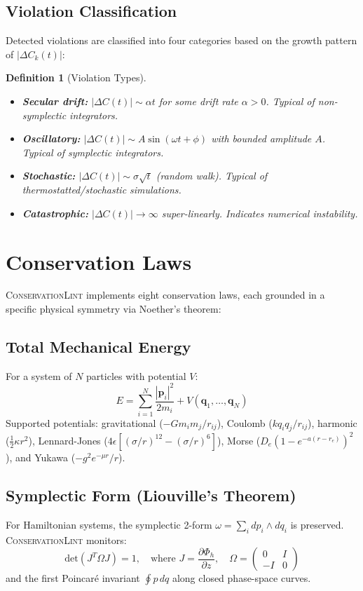 \documentclass[11pt,a4paper]{article}
\newtheorem{definition}{Definition}
\begin{document}
\subsection{Violation Classification}

Detected violations are classified into four categories based on the growth pattern of $|\Delta C_k(t)|$:

\begin{definition}[Violation Types]
\begin{itemize}
    \item \textbf{Secular drift:} $|\Delta C(t)| \sim \alpha t$ for some drift rate $\alpha > 0$. Typical of non-symplectic integrators.
    \item \textbf{Oscillatory:} $|\Delta C(t)| \sim A\sin(\omega t + \phi)$ with bounded amplitude $A$. Typical of symplectic integrators.
    \item \textbf{Stochastic:} $|\Delta C(t)| \sim \sigma\sqrt{t}$ (random walk). Typical of thermostatted/stochastic simulations.
    \item \textbf{Catastrophic:} $|\Delta C(t)| \to \infty$ super-linearly. Indicates numerical instability.
\end{itemize}
\end{definition}

\section{Conservation Laws}
\label{sec:laws}

\textsc{ConservationLint} implements eight conservation laws, each grounded in a specific physical symmetry via Noether's theorem:

\subsection{Total Mechanical Energy}
For a system of $N$ particles with potential $V$:
\begin{equation}
    E = \sum_{i=1}^{N} \frac{|\mathbf{p}_i|^2}{2m_i} + V(\mathbf{q}_1, \ldots, \mathbf{q}_N)
\end{equation}
Supported potentials: gravitational ($-Gm_im_j/r_{ij}$), Coulomb ($kq_iq_j/r_{ij}$), harmonic ($\frac{1}{2}\kappa r^2$), Lennard-Jones ($4\epsilon[(\sigma/r)^{12}-(\sigma/r)^6]$), Morse ($D_e(1-e^{-a(r-r_e)})^2$), and Yukawa ($-g^2 e^{-\mu r}/r$).

\subsection{Symplectic Form (Liouville's Theorem)}
For Hamiltonian systems, the symplectic 2-form $\omega = \sum_i dp_i \wedge dq_i$ is preserved. \textsc{ConservationLint} monitors:
\begin{equation}
    \text{det}(J^T \Omega J) = 1, \quad \text{where } J = \frac{\partial \Phi_h}{\partial z}, \quad \Omega = \begin{pmatrix} 0 & I \\ -I & 0 \end{pmatrix}
\end{equation}
and the first Poincar\'e invariant $\oint p\,dq$ along closed phase-space curves.
\end{document}
